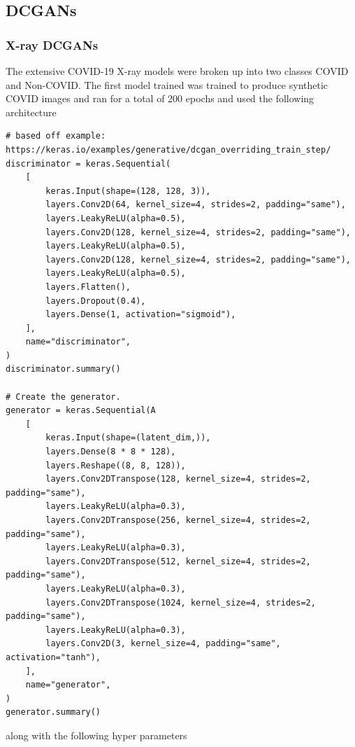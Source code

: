 \subsection{DCGANs}
\subsubsection{X-ray DCGANs}
The extensive COVID-19 X-ray models were broken up into two classes COVID and Non-COVID.  The first model trained was trained to produce synthetic COVID images and ran for a total of 200 epochs and used the following architecture
\begin{verbatim}
# based off example: https://keras.io/examples/generative/dcgan_overriding_train_step/
discriminator = keras.Sequential(
    [
        keras.Input(shape=(128, 128, 3)),
        layers.Conv2D(64, kernel_size=4, strides=2, padding="same"),
        layers.LeakyReLU(alpha=0.5),
        layers.Conv2D(128, kernel_size=4, strides=2, padding="same"),
        layers.LeakyReLU(alpha=0.5),
        layers.Conv2D(128, kernel_size=4, strides=2, padding="same"),
        layers.LeakyReLU(alpha=0.5),
        layers.Flatten(),
        layers.Dropout(0.4),
        layers.Dense(1, activation="sigmoid"),
    ],
    name="discriminator",
)
discriminator.summary()

# Create the generator.
generator = keras.Sequential(A
    [
        keras.Input(shape=(latent_dim,)),
        layers.Dense(8 * 8 * 128),
        layers.Reshape((8, 8, 128)),
        layers.Conv2DTranspose(128, kernel_size=4, strides=2, padding="same"),
        layers.LeakyReLU(alpha=0.3),
        layers.Conv2DTranspose(256, kernel_size=4, strides=2, padding="same"),
        layers.LeakyReLU(alpha=0.3),
        layers.Conv2DTranspose(512, kernel_size=4, strides=2, padding="same"),
        layers.LeakyReLU(alpha=0.3),
        layers.Conv2DTranspose(1024, kernel_size=4, strides=2, padding="same"),
        layers.LeakyReLU(alpha=0.3),
        layers.Conv2D(3, kernel_size=4, padding="same", activation="tanh"),
    ],
    name="generator",
)
generator.summary()
\end{verbatim}
along with the following hyper parameters
